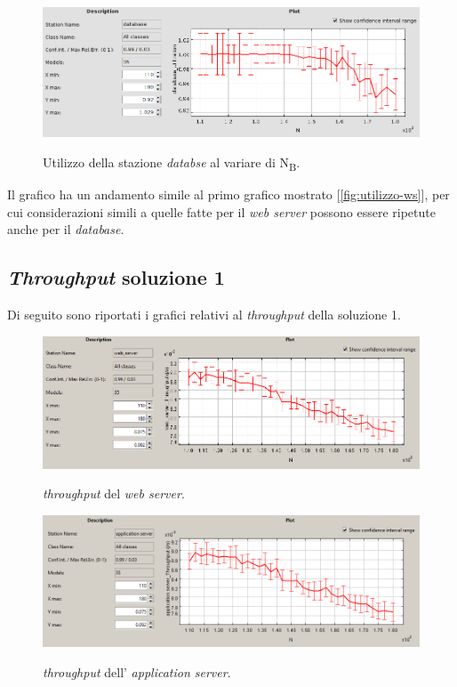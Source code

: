 \documentclass[../main.tex]{subfiles}
\begin{document}
    \begin{figure}[H]
        \centering
        \includegraphics[scale = 0.45]{assets/utilization_db.png}\\
        \caption[\textit{Utilizzo} della stazione \textit{database}]{Utilizzo della stazione\textit{
            databse} al variare di N\textsubscript{B}.}
        \label{fig:utilizzo-db}
    \end{figure}
    Il grafico ha un andamento simile al primo grafico mostrato [\ref{fig:utilizzo-ws}], per cui
    considerazioni simili a quelle fatte per il \textit{web server} possono essere ripetute anche per il \textit{database}.

    \subsection{\textit{Throughput} soluzione 1}\label{subsec:throughput-soluzione-1}
    Di seguito sono riportati i grafici relativi al \textit{throughput} della soluzione 1.
    \begin{figure}[H]
        \centering
        \includegraphics[scale = 0.6]{assets/ws_th_1.PNG}\\
        \caption[\textit{Throughput} del \textit{web server}]{\textit{throughput} del \textit{web server}.}
        \label{fig:throughput-time-ws}
    \end{figure}

    \begin{figure}[H]
        \centering
        \includegraphics[scale = 0.6]{assets/as_th_1.PNG}\\
        \caption[\textit{Throughput} dell' \textit{application server}]{\textit{throughput} dell' \textit{application server}.}
        \label{fig:throughput-time-as}
    \end{figure}
\end{document}
